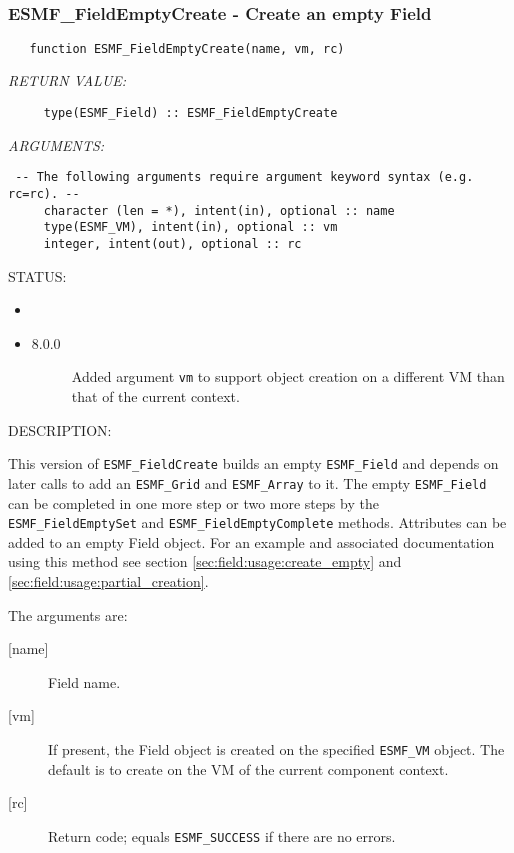  
\mbox{}\hrulefill\ 
 
\subsubsection [ESMF\_FieldEmptyCreate] {ESMF\_FieldEmptyCreate - Create an empty Field}


\begin{verbatim}   function ESMF_FieldEmptyCreate(name, vm, rc)\end{verbatim}{\em RETURN VALUE:}
\begin{verbatim}     type(ESMF_Field) :: ESMF_FieldEmptyCreate\end{verbatim}{\em ARGUMENTS:}
\begin{verbatim} -- The following arguments require argument keyword syntax (e.g. rc=rc). --
     character (len = *), intent(in), optional :: name
     type(ESMF_VM), intent(in), optional :: vm
     integer, intent(out), optional :: rc\end{verbatim}
{\sf STATUS:}
   \begin{itemize}
   \item{}
   \item{}
   \begin{description}
   \item[8.0.0] Added argument {\tt vm} to support object creation on a
   different VM than that of the current context.
   \end{description}
   \end{itemize}
  
{\sf DESCRIPTION:\\ }


   \begin{sloppypar}
   This version of {\tt ESMF\_FieldCreate} builds an empty {\tt ESMF\_Field}
   and depends on later calls to add an {\tt ESMF\_Grid} and {\tt ESMF\_Array} to
   it. The empty {\tt ESMF\_Field} can be completed in one more step or two more steps by
   the {\tt ESMF\_FieldEmptySet} and {\tt ESMF\_FieldEmptyComplete} methods.
   Attributes can be added to an empty Field object. For an example and
   associated documentation using this method see section
   \ref{sec:field:usage:create_empty} and \ref{sec:field:usage:partial_creation}.
   \end{sloppypar}
  
  
   The arguments are:
   \begin{description}
   \item [{[name]}]
   Field name.
   \item[{[vm]}]
   If present, the Field object is created on the specified
   {\tt ESMF\_VM} object. The default is to create on the VM of the
   current component context.
   \item [{[rc]}]
   Return code; equals {\tt ESMF\_SUCCESS} if there are no errors.
   \end{description}
   

